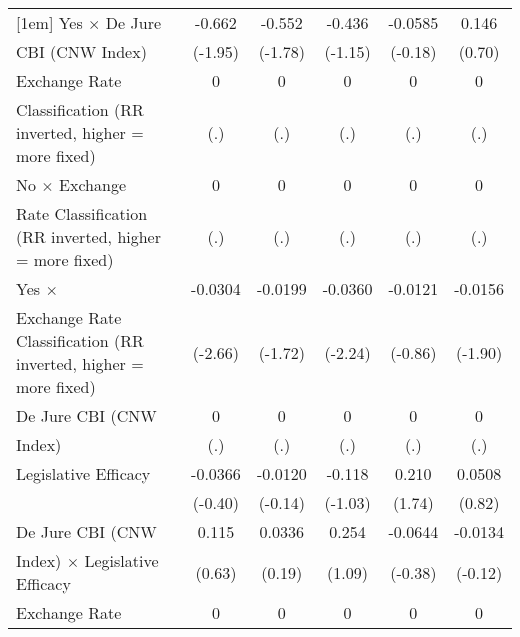 {\begin{tabular}{l*{5}{c}}
[1em]
Yes $\times$ De Jure&      -0.662         &      -0.552         &      -0.436         &     -0.0585         &       0.146         \\
CBI (CNW Index)     &     (-1.95)         &     (-1.78)         &     (-1.15)         &     (-0.18)         &      (0.70)         \\
[1em]
Exchange Rate       &           0         &           0         &           0         &           0         &           0         \\
Classification (RR inverted, higher = more fixed)&         (.)         &         (.)         &         (.)         &         (.)         &         (.)         \\
[1em]
No $\times$ Exchange&           0         &           0         &           0         &           0         &           0         \\
Rate Classification (RR inverted, higher = more fixed)&         (.)         &         (.)         &         (.)         &         (.)         &         (.)         \\
[1em]
Yes $\times$        &     -0.0304\sym{**} &     -0.0199         &     -0.0360\sym{*}  &     -0.0121         &     -0.0156         \\
Exchange Rate Classification (RR inverted, higher = more fixed)&     (-2.66)         &     (-1.72)         &     (-2.24)         &     (-0.86)         &     (-1.90)         \\
[1em]
De Jure CBI (CNW    &           0         &           0         &           0         &           0         &           0         \\
Index)              &         (.)         &         (.)         &         (.)         &         (.)         &         (.)         \\
[1em]
Legislative Efficacy&     -0.0366         &     -0.0120         &      -0.118         &       0.210         &      0.0508         \\
                    &     (-0.40)         &     (-0.14)         &     (-1.03)         &      (1.74)         &      (0.82)         \\
[1em]
De Jure CBI (CNW    &       0.115         &      0.0336         &       0.254         &     -0.0644         &     -0.0134         \\
Index) $\times$ Legislative Efficacy&      (0.63)         &      (0.19)         &      (1.09)         &     (-0.38)         &     (-0.12)         \\
[1em]
Exchange Rate       &           0         &           0         &           0         &           0         &           0         \\

\end{tabular}}
